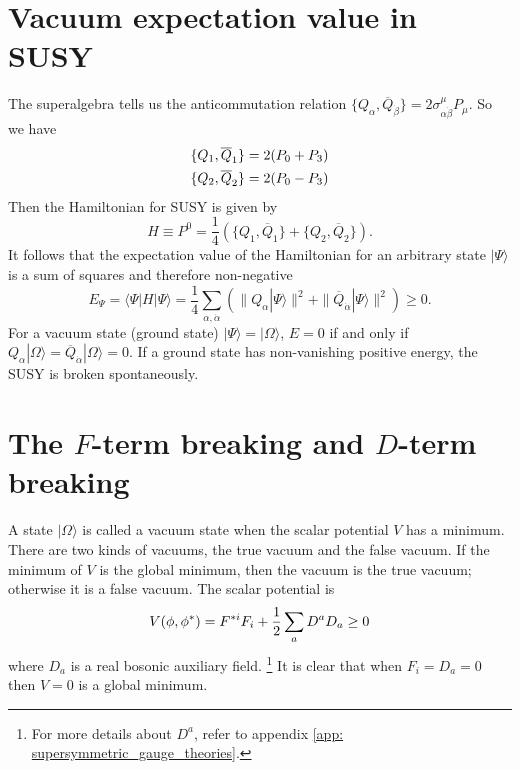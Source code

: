 \documentclass[12pt]{report}
\begin{document}
\section{Vacuum expectation value in SUSY}
The superalgebra tells us the anticommutation relation $\{ Q_{\alpha}, \overline{Q}_{\dot{\beta}} \} = 2 \sigma^{\mu}_{\alpha \dot{\beta}} P_{\mu}$.
So we have
\begin{align}
\{ Q_{1}, \overline{Q}_{1} \} = 2 ( P_{0} + P_{3}) \notag \\
\{ Q_{2}, \overline{Q}_{2} \} = 2 ( P_{0} - P_{3}) 
\end{align}
Then the Hamiltonian for SUSY is given by
\begin{equation}
H \equiv P^{0} = \frac{1}{4} (\{ Q_{1}, \overline{Q}_{1} \}  + \{ Q_{2}, \overline{Q}_{2} \} ) .
\end{equation}
It follows that the expectation value of the Hamiltonian for an arbitrary state $| \Psi \rangle$ is a sum of squares and therefore non-negative
\begin{equation}
E_{\Psi} = \langle \Psi | H | \Psi \rangle = \frac{1}{4} \sum_{\alpha, \dot{\alpha}} ( \| Q_{\alpha} | \Psi \rangle \|^2 + \| \overline{Q}_{\dot{\alpha}} | \Psi \rangle \|^2 ) \ge 0 .
\end{equation}
For a vacuum state (ground state) $|\Psi \rangle = | \Omega \rangle$, $E = 0$ if and only if $Q_{\alpha} | \Omega \rangle = \overline{Q}_{\dot{\alpha}} | \Omega \rangle = 0$.
If a ground state has non-vanishing positive energy, the SUSY is broken spontaneously. 



\section{The $F$-term breaking and $D$-term breaking}
A state $| \Omega \rangle$ is called a vacuum state when the scalar potential $V$ has a minimum.
There are two kinds of vacuums, the true vacuum and the false vacuum.
If the minimum of $V$ is the global minimum, then the vacuum is the true vacuum; otherwise it is a false vacuum.
The scalar potential is
\begin{equation}
V(\phi, \phi^{*}) = F^{*i} F_{i} + \frac{1}{2} \sum_{a} D^{a} D_{a} \ge 0 \notag
\end{equation}
where $D_{a}$ is a real bosonic auxiliary field. \footnote{For more details about $D^{a}$, refer to appendix \ref{app: supersymmetric_gauge_theories}.}
It is clear that when $F_{i} = D_{a} = 0$ then $V = 0$ is a global minimum.
\end{document}

